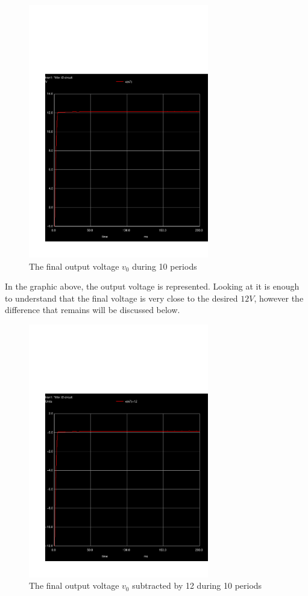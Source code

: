 \begin{figure}[H]\centering
\includegraphics[trim= 0cm 0cm 0cm 10cm, clip, width=0.7\textwidth]{trans2.pdf}
\caption{The final output voltage $v_0$ during 10 periods}
\label{fig:sim_output}
\end{figure}

In the graphic above, the output voltage is represented. Looking at it is enough to understand that the final voltage is very close to the desired $12V$, however the difference that remains will be discussed below.

\begin{figure}[H]\centering
\includegraphics[trim= 0cm 0cm 0cm 10cm, clip, width=0.7\textwidth]{trans3.pdf}
\caption{The final output voltage $v_0$ subtracted by 12 during 10 periods}
\label{fig:sim_outputdiff}
\end{figure}

